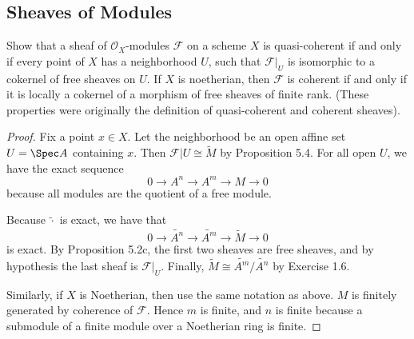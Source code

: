 \subsection{Sheaves of Modules}

\begin{exercise}%
	Show that a sheaf of $\mathcal{O}_X $-modules $\mathscr{F} $ on a scheme $X $ is quasi-coherent if and only if every point of $X $ has a neighborhood $U $, such that $\mathscr{F}|_U $ is isomorphic to a cokernel of free sheaves on $U $. If $X $ is noetherian, then $\mathscr{F} $ is coherent if and only if it is locally a cokernel of a morphism of free sheaves of finite rank. (These properties were originally the definition of quasi-coherent and coherent sheaves).
\end{exercise}
\begin{proof}
	Fix a point $x\in X $.
	Let the neighborhood be an open affine set $U = \Spec A $ containing $x $.
	Then $\mathscr{F}|U \cong \tilde{M} $ by Proposition 5.4.
	For all open $U $, we have the exact sequence
	\[
		0 \to A^{n} \to A^{m} \to M \to 0
	\]
	because all modules are the quotient of a free module.

	Because $\tilde{\cdot}$ is exact, we have that
	\[
		0 \to \tilde{A^n} \to \tilde{A^m} \to \tilde{M} \to 0
	\]
	is exact.
	By Proposition 5.2c, the first two sheaves are free sheaves, and by hypothesis the last sheaf is $\mathscr{F}|_U $.
	Finally, $\tilde{M} \cong \tilde{A^m} / \tilde{A^n} $ by Exercise 1.6.

	Similarly, if $X $ is Noetherian, then use the same notation as above.
	$M $ is finitely generated by coherence of $\mathscr{F} $.
	Hence $m $ is finite, and $n $ is finite because a submodule of a finite module over a Noetherian ring is finite.
\end{proof}

